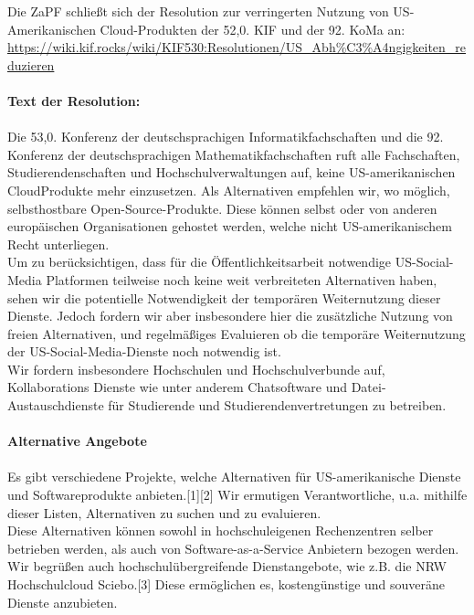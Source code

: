 \documentclass[DIV=calc]{scrartcl}
\begin{document}
Die ZaPF schließt sich der Resolution zur verringerten Nutzung von US-Amerikanischen
Cloud-Produkten der 52,0. KIF und der 92. KoMa an:
\url{https://wiki.kif.rocks/wiki/KIF530:Resolutionen/US_Abh%C3%A4ngigkeiten_reduzieren}\\\\
\textbf{Text der Resolution:}\\\\
 \glqq Die 53,0. Konferenz der deutschsprachigen Informatikfachschaften und die 92. Konferenz der deutschsprachigen Mathematikfachschaften ruft alle Fachschaften, Studierendenschaften und Hochschulverwaltungen auf, keine US-amerikanischen CloudProdukte mehr einzusetzen. Als Alternativen empfehlen wir, wo möglich, selbsthostbare Open-Source-Produkte. Diese können selbst oder von anderen europäischen Organisationen gehostet werden, welche nicht US-amerikanischem Recht unterliegen. \\
 Um zu berücksichtigen, dass für die Öffentlichkeitsarbeit notwendige US-Social-Media Platformen teilweise noch keine weit verbreiteten Alternativen haben, sehen wir die potentielle Notwendigkeit der temporären Weiternutzung dieser Dienste. Jedoch fordern wir aber insbesondere hier die zusätzliche Nutzung von freien Alternativen, und regelmäßiges Evaluieren ob die temporäre Weiternutzung der US-Social-Media-Dienste noch notwendig ist. \\
 Wir fordern insbesondere Hochschulen und Hochschulverbunde auf, Kollaborations Dienste wie unter anderem Chatsoftware und Datei-Austauschdienste für Studierende und Studierendenvertretungen zu betreiben.\\\\
 \textbf{Alternative Angebote}\\ \\
 Es gibt verschiedene Projekte, welche Alternativen für US-amerikanische Dienste und Softwareprodukte anbieten.[1][2] Wir ermutigen Verantwortliche, u.a. mithilfe dieser Listen, Alternativen zu suchen und zu evaluieren.\\
 Diese Alternativen können sowohl in hochschuleigenen Rechenzentren selber betrieben werden, als auch von Software-as-a-Service Anbietern bezogen werden.\\
 Wir begrüßen auch hochschulübergreifende Dienstangebote, wie z.B. die NRW Hochschulcloud Sciebo.[3] Diese ermöglichen es, kostengünstige und souveräne Dienste anzubieten.\\
 
\end{document}
